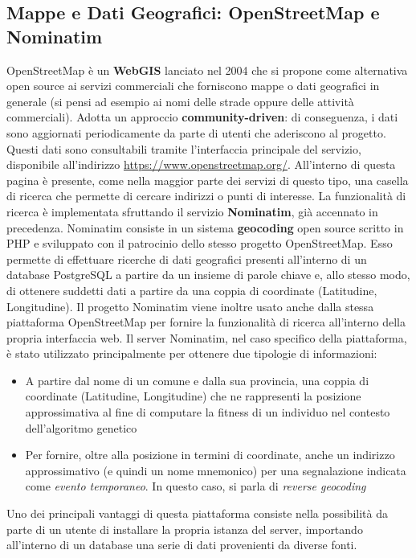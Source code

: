     \subsection{Mappe e Dati Geografici: OpenStreetMap e Nominatim}
        OpenStreetMap è un \textbf{WebGIS} lanciato nel 2004 che si propone come alternativa open source ai servizi commerciali che forniscono mappe o dati geografici in generale (si pensi ad esempio ai nomi delle strade oppure delle attività commerciali). Adotta un approccio \textbf{community-driven}: di conseguenza, i dati sono aggiornati periodicamente da parte di utenti che aderiscono al progetto. Questi dati sono consultabili tramite l'interfaccia principale del servizio, disponibile all'indirizzo \url{https://www.openstreetmap.org/}. All'interno di questa pagina è presente, come nella maggior parte dei servizi di questo tipo, una casella di ricerca che permette di cercare indirizzi o punti di interesse. La funzionalità di ricerca è implementata sfruttando il servizio \textbf{Nominatim}, già accennato in precedenza.
        Nominatim consiste in un sistema \textbf{geocoding} open source scritto in PHP e sviluppato con il patrocinio dello stesso progetto OpenStreetMap. Esso permette di effettuare ricerche di dati geografici presenti all'interno di un database PostgreSQL a partire da un insieme di parole chiave e, allo stesso modo, di ottenere suddetti dati a partire da una coppia di coordinate (Latitudine, Longitudine). Il progetto Nominatim viene inoltre usato anche dalla stessa piattaforma OpenStreetMap per fornire la funzionalità di ricerca all'interno della propria interfaccia web.
        Il server Nominatim, nel caso specifico della piattaforma, è stato utilizzato principalmente per ottenere due tipologie di informazioni:
        \begin{itemize}
            \item A partire dal nome di un comune e dalla sua provincia, una coppia di coordinate (Latitudine, Longitudine) che ne rappresenti la posizione approssimativa al fine di computare la fitness di un individuo nel contesto dell'algoritmo genetico
            \item Per fornire, oltre alla posizione in termini di coordinate, anche un indirizzo approssimativo (e quindi un nome mnemonico) per una segnalazione indicata come \textit{evento temporaneo}. In questo caso, si parla di \textit{reverse geocoding}
        \end{itemize}
        Uno dei principali vantaggi di questa piattaforma consiste nella possibilità da parte di un utente di installare la propria istanza del server, importando all'interno di un database una serie di dati provenienti da diverse fonti. 
